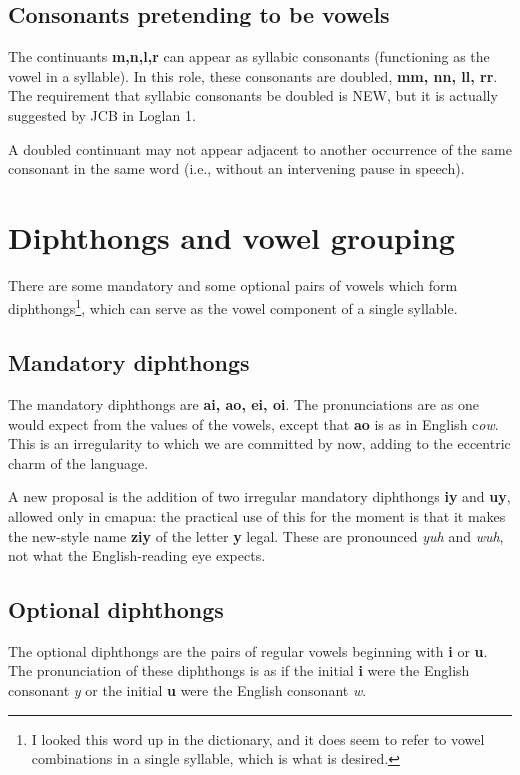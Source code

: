 \documentclass[12pt]{book}
\begin{document}
\subsection{Consonants pretending to be vowels}

The continuants {\bf m,n,l,r} can appear as syllabic consonants (functioning as the vowel in a syllable).  In this role, these consonants are doubled,
{\bf mm, nn, ll, rr}.  The requirement that syllabic consonants be doubled is NEW, but it is actually suggested by JCB in Loglan 1.

A doubled continuant may not appear adjacent to another occurrence of the same consonant in the same word (i.e., without an intervening pause in speech).

\section{Diphthongs and vowel grouping}

There are some mandatory and some optional pairs of vowels which form diphthongs\footnote{I looked this word up in the dictionary, and it does seem to refer to vowel combinations in a single syllable, which is what is desired.}, which can serve as the vowel component of a single syllable.

\subsection{Mandatory diphthongs}

The mandatory diphthongs are {\bf ai, ao, ei, oi}.  The pronunciations are as one would expect from the values of the vowels, except that
{\bf ao} is as in English c{\em ow}.  This is an irregularity to which we are committed by now, adding to the eccentric charm of the language.

A new proposal is the addition of two irregular mandatory diphthongs {\bf iy} and {\bf uy}, allowed only in cmapua:  the practical use of this
for the moment is that it makes the new-style name {\bf ziy} of the letter {\bf y} legal.  These are pronounced {\em yuh\/} and
{\em wuh\/}, not what the English-reading  eye expects.

\subsection{Optional diphthongs}

The optional diphthongs are the pairs of regular vowels beginning with {\bf i} or {\bf u}.  The pronunciation of these diphthongs is as if the initial {\bf i} were the English consonant {\em y} or the initial {\bf u} were the English consonant {\em w}.   
\end{document}

